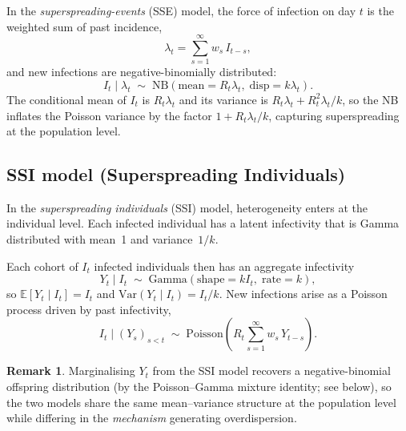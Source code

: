 \documentclass{article}
\theoremstyle{definition}
\newtheorem*{remark}{Remark}
\begin{document}
In the \emph{superspreading-events} (SSE) model, the force of infection on
day $t$ is the weighted sum of past incidence,
\begin{equation}
  \lambda_t = \sum_{s=1}^{\infty} w_s\, I_{t-s},
\end{equation}
and new infections are negative-binomially distributed:
\begin{equation}
  I_t \mid \lambda_t \;\sim\;
  \mathrm{NB}\!\left(\text{mean} = R_t \lambda_t,\;\text{disp} =
  k\lambda_t\right).
\end{equation}
The conditional mean of $I_t$ is $R_t \lambda_t$ and its variance is
$R_t \lambda_t + R_t^2 \lambda_t / k$, so the NB inflates the Poisson
variance by the factor $1 + R_t \lambda_t / k$, capturing superspreading at
the population level.

\subsection{SSI model (Superspreading Individuals)}
\label{sec:ssi}

In the \emph{superspreading individuals} (SSI) model, heterogeneity
enters at the individual level.  Each infected individual has a
latent infectivity that is Gamma distributed with mean~1 and variance~$1/k$.

Each cohort of $I_t$ infected individuals then has an aggregate infectivity
\begin{equation}
  Y_t \mid I_t \;\sim\;
  \mathrm{Gamma}\!\left(\text{shape} = k I_t,\;\text{rate} = k\right),
\end{equation}
so $\mathbb{E}[Y_t \mid I_t] = I_t$ and
$\mathrm{Var}(Y_t \mid I_t) = I_t/k$.  New infections arise as a Poisson
process driven by past infectivity,
\begin{equation}
  I_t \mid (Y_s)_{s < t} \;\sim\;
  \mathrm{Poisson}\!\left(R_t \sum_{s=1}^{\infty} w_s\, Y_{t-s}\right).
\end{equation}

\begin{remark}
  Marginalising $Y_t$ from the SSI model recovers a negative-binomial
  offspring distribution (by the Poisson--Gamma mixture identity; see
  below), so the two models share the same mean--variance structure at the
  population level while differing in the \emph{mechanism} generating
  overdispersion.
\end{remark}
\end{document}
